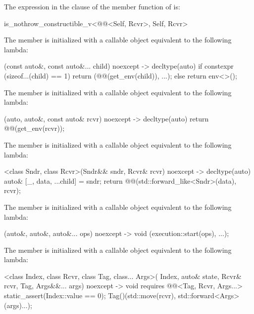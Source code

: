 \pnum
The expression in the  clause of
the  member function of  is:
\begin{codeblock}
is_nothrow_constructible_v<@@<Self, Rcvr>, Self, Rcvr>
\end{codeblock}

\pnum
The member 
is initialized with a callable object equivalent to the following lambda:
\begin{codeblock}
[](const auto&, const auto&... child) noexcept -> decltype(auto) {
  if constexpr (sizeof...(child) == 1)
    return (@@(get_env(child)), ...);
  else
    return env<>();
}
\end{codeblock}

\pnum
The member 
is initialized with a callable object equivalent to the following lambda:
\begin{codeblock}
[](auto, auto&, const auto& rcvr) noexcept -> decltype(auto) {
  return @@(get_env(rcvr));
}
\end{codeblock}

\pnum
The member 
is initialized with a callable object equivalent to the following lambda:
\begin{codeblock}
[]<class Sndr, class Rcvr>(Sndr&& sndr, Rcvr& rcvr) noexcept -> decltype(auto) {
  auto& [_, data, ...child] = sndr;
  return @@(std::forward_like<Sndr>(data), rcvr);
}
\end{codeblock}

\pnum
The member 
is initialized with a callable object equivalent to the following lambda:
\begin{codeblock}
[](auto&, auto&, auto&... ops) noexcept -> void {
  (execution::start(ops), ...);
}
\end{codeblock}

\pnum
The member 
is initialized with a callable object equivalent to the following lambda:
\begin{codeblock}
[]<class Index, class Rcvr, class Tag, class... Args>(
  Index, auto& state, Rcvr& rcvr, Tag, Args&&... args) noexcept
    -> void requires @@<Tag, Rcvr, Args...> {
  static_assert(Index::value == 0);
  Tag()(std::move(rcvr), std::forward<Args>(args)...);
}
\end{codeblock}

